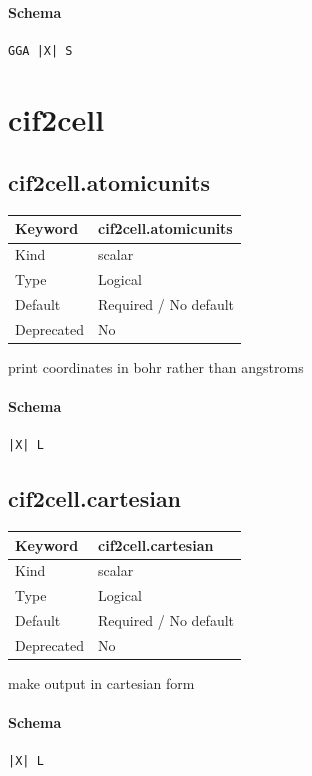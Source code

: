 \documentclass[11pt]{article}
\begin{document}
{{{{{\paragraph{Schema}
\begin{Verbatim}
GGA |X| S
\end{Verbatim}

\section{cif2cell}

\subsection{cif2cell.atomicunits}
\label{kw:cif2cell-atomicunits}
\begin{longtable}{|p{1.5in}|p{4.5in}|}
\hline
Keyword & cif2cell.atomicunits \\
\hline
Kind & scalar \\
\hline
Type & Logical \\
\hline
Default & Required / No default \\
\hline
Deprecated & No \\
\hline
\end{longtable}
 print coordinates in bohr rather than angstroms

\paragraph{Schema}
\begin{Verbatim}
|X| L
\end{Verbatim}

\subsection{cif2cell.cartesian}
\label{kw:cif2cell-cartesian}
\begin{longtable}{|p{1.5in}|p{4.5in}|}
\hline
Keyword & cif2cell.cartesian \\
\hline
Kind & scalar \\
\hline
Type & Logical \\
\hline
Default & Required / No default \\
\hline
Deprecated & No \\
\hline
\end{longtable}
 make output in cartesian form

\paragraph{Schema}
\begin{Verbatim}
|X| L
\end{Verbatim}

}}}}}
\end{document}
